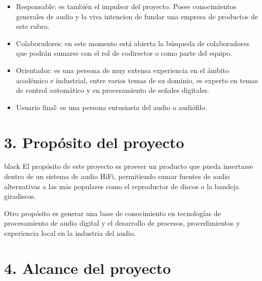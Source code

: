 \documentclass[
11pt, %
codirector, %
]{charter}
\begin{document}
\begin{itemize}
	\item Responsable: es también el impulsor del proyecto. Posee conocimientos generales de audio y la viva intencion de fundar una empresa de productos de este rubro. 
	\item Colaboradores: en este momento está abierta la búsqueda de colaboradores que podrán sumarse con el rol de codirector o como parte del equipo.
	\item Orientador: es una persona de muy extensa experiencia en el ámbito académico e industrial, entre varios temas de su dominio, es experto en temas de control automático y en procesamiento de señales digitales.
	\item Usuario final: es una persona entusiasta del audio o audiófilo.
\end{itemize}

\section{3. Propósito del proyecto}
\label{sec:proposito}

\begin{consigna}{black}
El propósito de este proyecto es proveer un producto que pueda insertarse dentro de un sistema de audio HiFi, permitiendo sumar fuentes de audio alternativas a las más populares como el reproductor de discos o la bandeja giradiscos.
 
Otro propósito es generar una base de conocimiento en tecnologías de procesamiento de audio digital y el desarrollo de procesos, procedimientos y experiencia local en la industria del audio. 
\end{consigna}





\section{4. Alcance del proyecto}
\label{sec:alcance}
\end{document}
